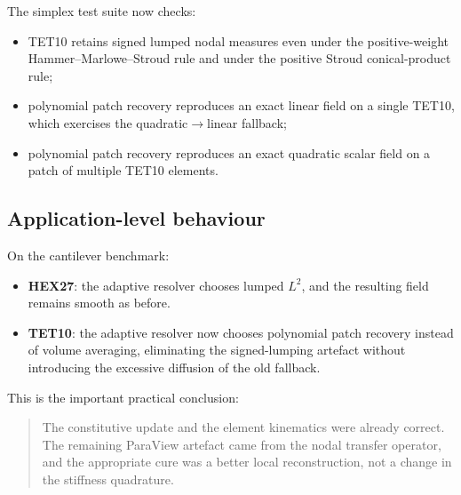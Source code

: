 The simplex test suite now checks:
\begin{itemize}[nosep]
  \item TET10 retains signed lumped nodal measures even under the
        positive-weight Hammer--Marlowe--Stroud rule and under the positive
        Stroud conical-product rule;
  \item polynomial patch recovery reproduces an exact linear field on a single
        TET10, which exercises the quadratic$\rightarrow$linear fallback;
  \item polynomial patch recovery reproduces an exact quadratic scalar field
        on a patch of multiple TET10 elements.
\end{itemize}

\subsection{Application-level behaviour}

On the cantilever benchmark:
\begin{itemize}[nosep]
  \item \textbf{HEX27}: the adaptive resolver chooses lumped $L^2$, and the
        resulting field remains smooth as before.
  \item \textbf{TET10}: the adaptive resolver now chooses polynomial patch
        recovery instead of volume averaging, eliminating the signed-lumping
        artefact without introducing the excessive diffusion of the old
        fallback.
\end{itemize}

This is the important practical conclusion:
\begin{quote}
The constitutive update and the element kinematics were already correct.  The
remaining ParaView artefact came from the nodal transfer operator, and the
appropriate cure was a better local reconstruction, not a change in the
stiffness quadrature.
\end{quote}
